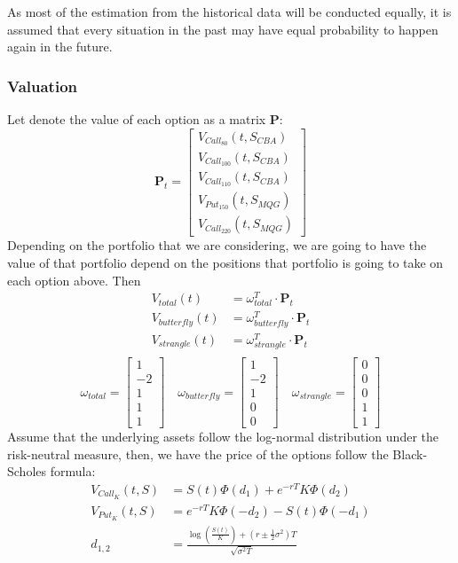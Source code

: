 As most of the estimation from the historical data will be conducted equally, it is assumed that every situation in the past may have equal probability to happen again in the future.
\subsubsection{Valuation}
Let denote the value of each option as a matrix $\mathbf{P}$:
$$
\mathbf{P}_t= \begin{bmatrix} V_{Call_{80}}(t, S_{CBA}) \\  V_{Call_{100}}(t, S_{CBA})\\ V_{Call_{110}}(t, S_{CBA}) \\ V_{Put_{150}}(t, S_{MQG}) \\  V_{Call_{220}}(t, S_{MQG})\end{bmatrix}
$$
Depending on the portfolio that we are considering, we are going to have the value of that portfolio depend on the positions that portfolio is going to take on each option above. Then
\begin{align*}
    V_{total}(t) &= \omega_{total}^T \cdot \mathbf{P}_t \\
    V_{butterfly}(t) &= \omega_{butterfly}^T \cdot \mathbf{P}_t \\
    V_{strangle}(t) &= \omega_{strangle}^T \cdot \mathbf{P}_t \\
\end{align*}
$$
    \omega_{total} = \begin{bmatrix}1\\ -2\\ 1\\ 1\\ 1\end{bmatrix} \quad \omega_{butterfly} = \begin{bmatrix}1\\ -2\\ 1\\ 0\\ 0\end{bmatrix} \quad \omega_{strangle} =\begin{bmatrix}0\\ 0\\ 0\\ 1\\ 1\end{bmatrix}
$$
Assume that the underlying assets follow the log-normal distribution under the risk-neutral measure, then, we have the price of the options follow the Black-Scholes formula:
\begin{align*}
    V_{Call_K}(t,S)&=S(t)\Phi(d_1)+e^{-rT}K\Phi(d_2)\\
    V_{Put_K}(t,S)&=e^{-rT}K\Phi(-d_2)-S(t)\Phi(-d_1)\\
    d_{1,2}&=\frac{\log\left(\frac{S(t)}{K}\right)+(r\pm\frac{1}{2}\sigma^2)T}{\sqrt{\sigma^2T}}
\end{align*}
